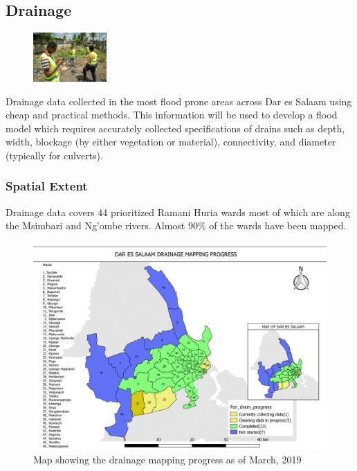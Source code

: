 \documentclass[a4paper,12pt,twoside]{article}
\begin{document}
\subsection{Drainage}
\begin{figure} %
    \centering
    \includegraphics[width=0.25\textwidth]{images/Drainage_Mapping.jpg}
\end{figure}
Drainage data collected in the most flood prone areas across Dar es Salaam using cheap  and practical methods. This information will be used to develop a flood model which requires accurately collected specifications of drains such as depth, width, blockage (by either vegetation or material), connectivity, and diameter (typically for culverts).

\subsubsection{Spatial Extent}
Drainage data covers 44 prioritized Ramani Huria wards most of which are along the Msimbazi and Ng’ombe rivers. Almost 90\% of the wards have been mapped.

\begin{figure}[h]
  \color{RHgreen}\caption{Map showing the drainage mapping progress as of March, 2019}
  \centering
  \includegraphics[width=1\textwidth]{images/Dar_drainage_mapping_progress.png}
\end{figure}
\end{document}
